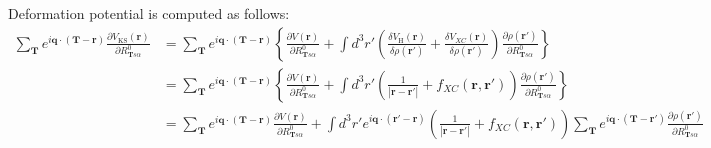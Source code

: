 \documentclass{article}
\begin{document}
Deformation potential is computed as follows:
\begin{align}
    \sum_{\textbf{T}}e^{i\textbf{q}\cdot(\textbf{T}-\textbf{r})} 
    \frac{\partial V_\textrm{KS}(\textbf{r})}{\partial R^0_{\textbf{T}s\alpha}}   
    &=
    \sum_{\textbf{T}}e^{i\textbf{q}\cdot(\textbf{T}-\textbf{r})} 
    \left\{
    \frac{\partial V(\textbf{r})}{\partial R^0_{\textbf{T}s\alpha}}
    +
    \int d^3r'
    \left(
    \frac{\delta V_\textrm{H}(\textbf{r})}{\delta \rho(\textbf{r}')}
    +\frac{\delta V_{XC}(\textbf{r})}{\delta \rho(\textbf{r}')}
    \right)
    \frac{\partial \rho(\textbf{r}')}{\partial R^0_{\textbf{T}s\alpha}}
    \right\}
    \nonumber \\
    &=
    \sum_{\textbf{T}}e^{i\textbf{q}\cdot(\textbf{T}-\textbf{r})} 
    \left\{
    \frac{\partial V(\textbf{r})}{\partial R^0_{\textbf{T}s\alpha}}
    +
    \int d^3r'
    \left(
    \frac{1}{|\textbf{r}-\textbf{r}'|}
    + f_{XC}(\textbf{r}, \textbf{r}')
    \right)
    \frac{\partial \rho(\textbf{r}')}{\partial R^0_{\textbf{T}s\alpha}}
    \right\}
    \nonumber \\
    &=
    \sum_{\textbf{T}}e^{i\textbf{q}\cdot(\textbf{T}-\textbf{r})} 
    \frac{\partial V(\textbf{r})}{\partial R^0_{\textbf{T}s\alpha}}
    +
    \int d^3r'
    e^{i\textbf{q}\cdot(\textbf{r}'-\textbf{r})} 
    \left(
    \frac{1}{|\textbf{r}-\textbf{r}'|}
    + f_{XC}(\textbf{r}, \textbf{r}')
    \right)
    \sum_{\textbf{T}}e^{i\textbf{q}\cdot(\textbf{T}-\textbf{r}')} 
    \frac{\partial \rho(\textbf{r}')}{\partial R^0_{\textbf{T}s\alpha}}
\end{align}
\end{document}
